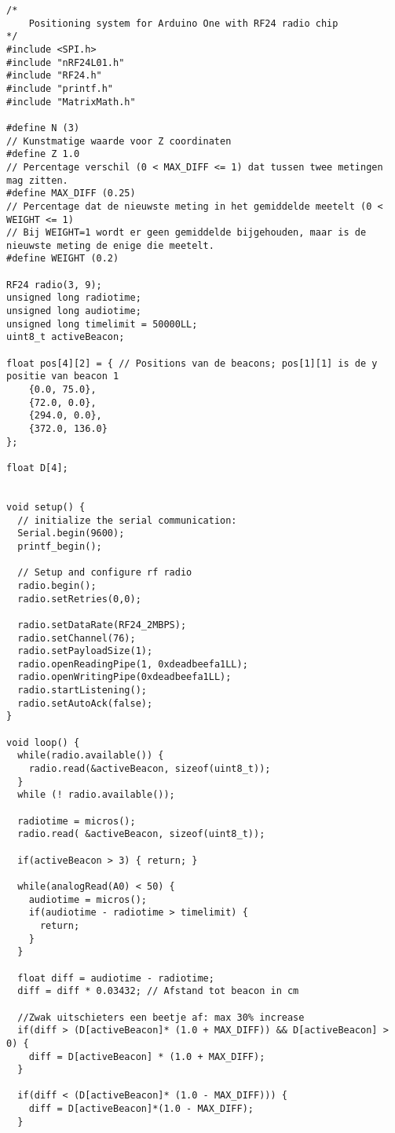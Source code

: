 \begin{lstlisting}
/*
    Positioning system for Arduino One with RF24 radio chip
*/
#include <SPI.h>
#include "nRF24L01.h"
#include "RF24.h"
#include "printf.h"
#include "MatrixMath.h"

#define N (3)
// Kunstmatige waarde voor Z coordinaten
#define Z 1.0
// Percentage verschil (0 < MAX_DIFF <= 1) dat tussen twee metingen mag zitten.
#define MAX_DIFF (0.25)
// Percentage dat de nieuwste meting in het gemiddelde meetelt (0 < WEIGHT <= 1)
// Bij WEIGHT=1 wordt er geen gemiddelde bijgehouden, maar is de nieuwste meting de enige die meetelt.
#define WEIGHT (0.2)

RF24 radio(3, 9);
unsigned long radiotime;
unsigned long audiotime;
unsigned long timelimit = 50000LL;
uint8_t activeBeacon;

float pos[4][2] = { // Positions van de beacons; pos[1][1] is de y positie van beacon 1
    {0.0, 75.0},
    {72.0, 0.0},
    {294.0, 0.0},
    {372.0, 136.0}
};

float D[4];


void setup() {
  // initialize the serial communication:
  Serial.begin(9600);
  printf_begin();

  // Setup and configure rf radio
  radio.begin();
  radio.setRetries(0,0);

  radio.setDataRate(RF24_2MBPS);
  radio.setChannel(76);
  radio.setPayloadSize(1);
  radio.openReadingPipe(1, 0xdeadbeefa1LL);
  radio.openWritingPipe(0xdeadbeefa1LL);
  radio.startListening();
  radio.setAutoAck(false);
}

void loop() {
  while(radio.available()) { 
    radio.read(&activeBeacon, sizeof(uint8_t)); 
  }
  while (! radio.available());

  radiotime = micros();
  radio.read( &activeBeacon, sizeof(uint8_t));

  if(activeBeacon > 3) { return; }

  while(analogRead(A0) < 50) {
    audiotime = micros();
    if(audiotime - radiotime > timelimit) {
      return; 
    }
  }
  
  float diff = audiotime - radiotime;
  diff = diff * 0.03432; // Afstand tot beacon in cm

  //Zwak uitschieters een beetje af: max 30% increase
  if(diff > (D[activeBeacon]* (1.0 + MAX_DIFF)) && D[activeBeacon] > 0) {
    diff = D[activeBeacon] * (1.0 + MAX_DIFF);
  }
  
  if(diff < (D[activeBeacon]* (1.0 - MAX_DIFF))) {
    diff = D[activeBeacon]*(1.0 - MAX_DIFF);
  }
  

\end{lstlisting}
